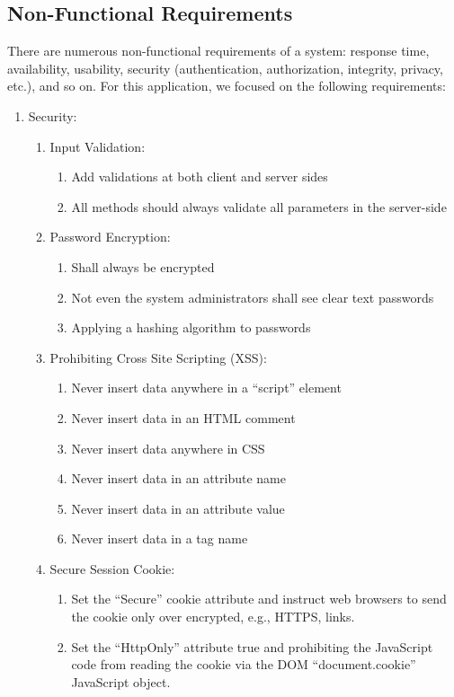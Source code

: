 \subsection{Non-Functional Requirements}
There are numerous non-functional requirements of a system: response time, availability, usability, security (authentication, authorization, integrity, privacy, etc.), and so on. For this application, we focused on the following requirements:
\begin{enumerate}
  \item Security:
  \begin{enumerate}
    \item Input Validation:
    \begin{enumerate}
      \item Add validations at both client and server sides
      \item All methods should always validate all parameters in the server-side
    \end{enumerate}
    \item Password Encryption:
    \begin{enumerate}
      \item Shall always be encrypted
      \item Not even the system administrators shall see clear text passwords
      \item Applying a hashing algorithm to passwords
    \end{enumerate}
    \item Prohibiting Cross Site Scripting (XSS):
    \begin{enumerate}
      \item Never insert data anywhere in a ``script'' element
      \item Never insert data in an HTML comment
      \item Never insert data anywhere in CSS
      \item Never insert data in an attribute name
      \item Never insert data in an attribute value
      \item Never insert data in a tag name
    \end{enumerate}
    \item Secure Session Cookie:
    \begin{enumerate}
      \item Set the ``Secure'' cookie attribute and instruct web browsers to send the cookie only over encrypted, e.g., HTTPS, links.
      \item Set the ``HttpOnly'' attribute true and prohibiting the JavaScript code from reading the cookie via the DOM ``document.cookie'' JavaScript object.

\end{enumerate}
\end{enumerate}
\end{enumerate}
